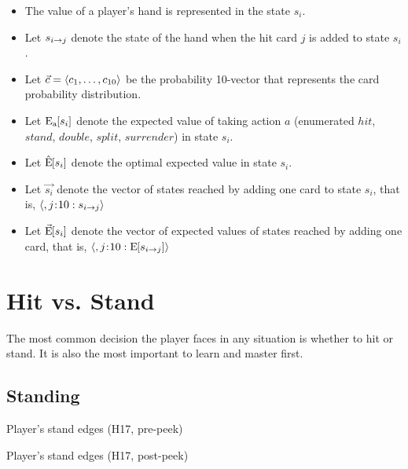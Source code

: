 \begin{itemize}
\item The value of a player's hand is represented in the state $s_i$.
\item Let $s_{i\rightarrow{}j}$ denote the state of the hand
when the hit card $j$ is added to state $s_i$.
\item Let $\vec{c}=\langle c_1, \ldots, c_{10}\rangle$ be the probability 10-vector
	that represents the card probability distribution.
\item Let $\textrm{E}_{\textrm{a}}\hspace{-.5ex}\left[s_i\right]$ denote the expected value of taking action
$a$ (enumerated $hit$, $stand$, $double$, $split$, $surrender$) in state $s_i$.
\item Let $\hat{\textrm{E}}\hspace{-.5ex}\left[s_i\right]$ denote the optimal expected value in state $s_i$.
\item Let $\Vec{s_i}$ denote the vector of states reached by adding 
	one card to state $s_i$, that is, $\langle,j\hspace{-.5ex}:\hspace{-.5ex}10 : s_{i\rightarrow{}j}\rangle$
\item Let $\vec{\textrm{E}}\hspace{-.5ex}\left[s_i\right]$ denote the vector of expected values of 
	states reached by adding one card, that is, 
	$\langle,j\hspace{-.5ex}:\hspace{-.5ex}10 : \textrm{E}\hspace{-.5ex}\left[s_{i\rightarrow{}j}\right]\rangle$
\end{itemize}

\section{Hit vs. Stand}
\label{sec:basic:hit-stand}

The most common decision the player faces in any situation
is whether to hit or stand.
It is also the most important to learn and master first.

\subsection{Standing}
\label{sec:basic:hit-stand:stand}

\begin{table}[ht!]
\caption{Player's stand edges (H17, pre-peek)}
\begin{center}

\end{center}
\label{tab:player-stand-H17-pre-peek}
\end{table}

\begin{table}[ht!]
\caption{Player's stand edges (H17, post-peek)}
\begin{center}

\end{center}
\label{tab:player-stand-H17-post-peek}
\end{table}

